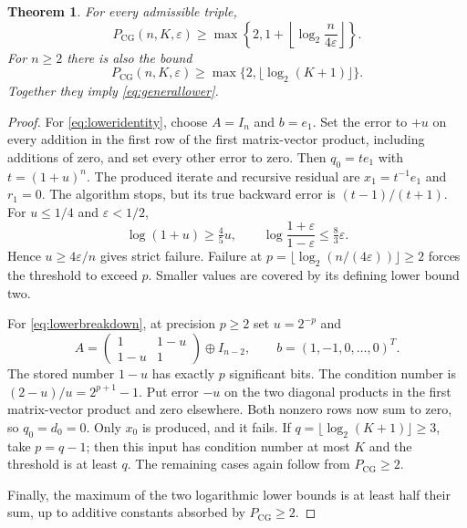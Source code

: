 \documentclass[11pt]{article}
\newtheorem{theorem}{Theorem}[section]
\theoremstyle{remark}\newtheorem{remark}[theorem]{Remark}
\newcommand{\PCG}{P_{\mathrm{CG}}}
\newcommand{\eps}{\varepsilon}
\begin{document}
\begin{theorem}\label{thm:lower}
For every admissible triple,
\begin{equation}\label{eq:loweridentity}
\PCG(n,K,\eps)\ge
\max\left\{2,1+\left\lfloor\log_2\frac{n}{4\eps}\right\rfloor\right\}.
\end{equation}
For $n\ge2$ there is also the bound
\begin{equation}\label{eq:lowerbreakdown}
\PCG(n,K,\eps)\ge\max\{2,\lfloor\log_2(K+1)\rfloor\}.
\end{equation}
Together they imply \eqref{eq:generallower}.
\end{theorem}
\begin{proof}
For \eqref{eq:loweridentity}, choose $A=I_n$ and $b=e_1$.
Set the error to $+u$ on every addition in the first row of the first
matrix-vector product, including additions of zero, and set every other
error to zero. Then $q_0=t e_1$ with $t=(1+u)^n$. The produced iterate
and recursive residual are $x_1=t^{-1}e_1$ and $r_1=0$. The algorithm
stops, but its true backward error is $(t-1)/(t+1)$.
For $u\le1/4$ and $\eps<1/2$,
\[
\log(1+u)\ge\tfrac45u,\qquad
\log\frac{1+\eps}{1-\eps}\le\tfrac83\eps.
\]
Hence $u\ge4\eps/n$ gives strict failure. Failure at
$p=\lfloor\log_2(n/(4\eps))\rfloor\ge2$ forces the threshold to exceed
$p$. Smaller values are covered by its defining lower bound two.

For \eqref{eq:lowerbreakdown}, at precision $p\ge2$ set $u=2^{-p}$ and
\[
A=\begin{pmatrix}1&1-u\\1-u&1\end{pmatrix}\oplus I_{n-2},\qquad
b=(1,-1,0,\ldots,0)^T.
\]
The stored number $1-u$ has exactly $p$ significant bits. The condition
number is $(2-u)/u=2^{p+1}-1$. Put error $-u$ on the two diagonal
products in the first matrix-vector product and zero elsewhere. Both
nonzero rows now sum to zero, so $q_0=d_0=0$. Only $x_0$ is produced,
and it fails. If $q=\lfloor\log_2(K+1)\rfloor\ge3$, take $p=q-1$;
then this input has condition number at most $K$ and the threshold is at
least $q$. The remaining cases again follow from $\PCG\ge2$.

Finally, the maximum of the two logarithmic lower bounds is at least
half their sum, up to additive constants absorbed by $\PCG\ge2$.
\end{proof}
\end{document}
